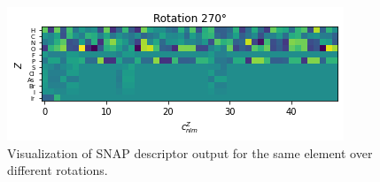 \begin{figure}
\begin{multicols}{2}
      \includegraphics[width=\linewidth]{figures/regression/snap/rot270.png}\par
  \end{multicols}
  \caption[SNAP descriptor output for multiple rotations]{Visualization of SNAP descriptor output for the same element over different rotations.}
  \label{fig:snap_roation_out}
\end{figure}



